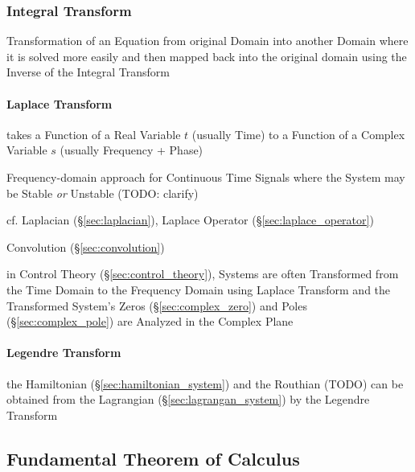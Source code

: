 \subsubsection{Integral Transform}\label{sec:integral_transform}

Transformation of an Equation from original Domain into another Domain where it
is solved more easily and then mapped back into the original domain using the
Inverse of the Integral Transform



\paragraph{Laplace Transform}\label{sec:laplace_transform}\hfill

takes a Function of a Real Variable $t$ (usually Time) to a Function of a
Complex Variable $s$ (usually Frequency + Phase)

Frequency-domain approach for Continuous Time Signals where the System may be
Stable \emph{or} Unstable (TODO: clarify)

\fist cf. Laplacian (\S\ref{sec:laplacian}), Laplace Operator
(\S\ref{sec:laplace_operator}) %

Convolution (\S\ref{sec:convolution})

in Control Theory (\S\ref{sec:control_theory}), Systems are often Transformed
from the Time Domain to the Frequency Domain using Laplace Transform and the
Transformed System's Zeros (\S\ref{sec:complex_zero}) and Poles
(\S\ref{sec:complex_pole}) are Analyzed in the Complex Plane



\paragraph{Legendre Transform}\label{sec:legendre_transform}\hfill

the Hamiltonian (\S\ref{sec:hamiltonian_system}) and the Routhian (TODO) can be
obtained from the Lagrangian (\S\ref{sec:lagrangan_system}) by the Legendre
Transform



\subsection{Fundamental Theorem of Calculus}
\label{sec:fundamental_calculus_theorem}

